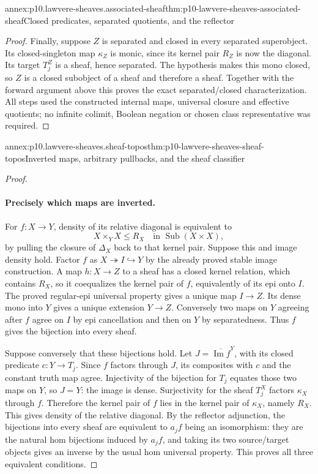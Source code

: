\begin{annexitem}{annex:p10.lawvere-sheaves.associated-sheaf}{thm:p10-lawvere-sheaves-associated-sheaf}{Closed predicates, separated quotients, and the reflector}
\begin{proof}
Finally, suppose \(Z\) is separated and closed in
every separated superobject.  Its closed-singleton
map \(\kappa_Z\) is monic, since its kernel pair
\(R_Z\) is now the diagonal.  Its target \(T_j^Z\)
is a sheaf, hence separated.  The hypothesis makes
this mono closed, so \(Z\) is a closed subobject
of a sheaf and therefore a sheaf.  Together with
the forward argument above this proves the exact
separated/closed characterization.  All steps used
the constructed internal maps, universal closure
and effective quotients; no infinite colimit,
Boolean negation or chosen class representative
was required.
\end{proof}
\end{annexitem}

\begin{annexitem}{annex:p10.lawvere-sheaves.sheaf-topos}{thm:p10-lawvere-sheaves-sheaf-topos}{Inverted maps, arbitrary pullbacks, and the sheaf classifier}
\begin{proof}
\paragraph{Precisely which maps are inverted.}
For \(f:X\to Y\), density of its relative diagonal
is equivalent to
\[
                    X\times_YX\leq R_X
                         \quad\text{in }\operatorname{Sub}(X\times X),
\]
by pulling the closure of \(\Delta_X\) back to that
kernel pair.  Suppose this and image density hold.
Factor \(f\) as \(X\twoheadrightarrow I\hookrightarrow Y\)
by the already proved stable image construction.  A map
\(h:X\to Z\) to a sheaf has a closed kernel relation,
which contains \(R_X\), so it coequalizes the kernel
pair of \(f\), equivalently of its epi onto \(I\).
The proved regular-epi universal property gives a unique
map \(I\to Z\).  Its dense mono into \(Y\) gives a
unique extension \(Y\to Z\).  Conversely two maps
on \(Y\) agreeing after \(f\) agree on \(I\) by
epi cancellation and then on \(Y\) by separatedness.
Thus \(f\) gives the bijection into every sheaf.

Suppose conversely that these bijections hold.  Let
\(J=\overline{\operatorname{Im}f}^{Y}\), with its
closed predicate \(c:Y\to T_j\).  Since \(f\)
factors through \(J\), its composites with \(c\)
and the constant truth map agree.  Injectivity of
the bijection for \(T_j\) equates those two maps
on \(Y\), so \(J=Y\): the image is dense.
Surjectivity for the sheaf \(T_j^X\) factors
\(\kappa_X\) through \(f\).  Therefore the kernel
pair of \(f\) lies in the kernel pair of
\(\kappa_X\), namely \(R_X\).  This gives density
of the relative diagonal.  By the reflector
adjunction, the bijections into every sheaf are
equivalent to \(a_jf\) being an isomorphism:
they are the natural hom bijections induced by
\(a_jf\), and taking its two source/target objects
gives an inverse by the usual hom universal property.
This proves all three equivalent conditions.


\end{proof}
\end{annexitem}
